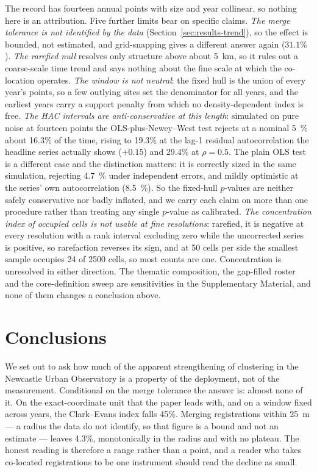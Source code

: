 \documentclass{article}
\newcommand{\nwSize}{16.3}
\newcommand{\nwSizeAr}{19.3}
\newcommand{\nwSizeArHigh}{29.4}
\newcommand{\olsSizeIid}{4.7}
\newcommand{\olsSizeAr}{8.5}
\newcommand{\locHullDrop}{45}
\newcommand{\gridSnapFall}{31.1}
\begin{document}
The record has fourteen annual points with size and year collinear, so nothing here is an
attribution. Five further limits bear on specific claims. \emph{The merge tolerance is not
identified by the data} (Section~\ref{sec:results-trend}), so the effect is bounded, not
estimated, and grid-snapping gives a different answer again ($\num{\gridSnapFall}\%$). \emph{The
rarefied null} resolves only structure above about \SI{5}{\kilo\meter}, so it rules out a
coarse-scale time trend and says nothing about the fine scale at which the co-location operates.
\emph{The window is not neutral}: the fixed hull is the union of every year's points, so a few
outlying sites set the denominator for all years, and the earliest years carry a support penalty
from which no density-dependent index is free. \emph{The HAC intervals are anti-conservative at
this length}: simulated on pure noise at fourteen points the OLS-plus-Newey--West test rejects at
a nominal \SI{5}{\percent} about \nwSize\% of the time, rising to \nwSizeAr\% at the lag-1
residual autocorrelation the headline series actually shows ($+0.15$) and \nwSizeArHigh\% at
$\rho = 0.5$. The plain OLS test is a different case and the distinction matters: it is correctly
sized in the same simulation, rejecting \SI{\olsSizeIid}{\percent} under independent errors, and
mildly optimistic at the series' own autocorrelation
(\SI{\olsSizeAr}{\percent}). So the fixed-hull $p$-values are neither safely conservative nor
badly inflated, and we carry each claim on more than one procedure rather than treating any
single $p$-value as calibrated.
\emph{The concentration index
of occupied cells is not usable at fine resolutions}: rarefied, it is negative at every
resolution with a rank interval excluding zero while the uncorrected series is positive, so
rarefaction reverses its sign, and at 50 cells per side the smallest sample occupies 24 of 2500
cells, so most counts are one. Concentration is unresolved in either direction.
The thematic composition, the gap-filled roster and the core-definition sweep are sensitivities
in the Supplementary Material, and none of them changes a conclusion above.

\section{Conclusions}
\label{sec:conclusions}

We set out to ask how much of the apparent strengthening of clustering in the Newcastle Urban
Observatory is a property of the deployment, not of the measurement. Conditional on the merge
tolerance the answer is: almost none of it. On the exact-coordinate unit that the paper leads
with, and on a window fixed across years, the Clark--Evans index falls \locHullDrop\%. Merging
registrations within \SI{25}{\meter} --- a radius the data do not identify, so that figure is a
bound and not an estimate --- leaves \num{4.3}\%, monotonically in the radius and with no
plateau. The honest reading is therefore a range rather than a point, and a reader who takes
co-located registrations to be one instrument should read the decline as small.
\end{document}
